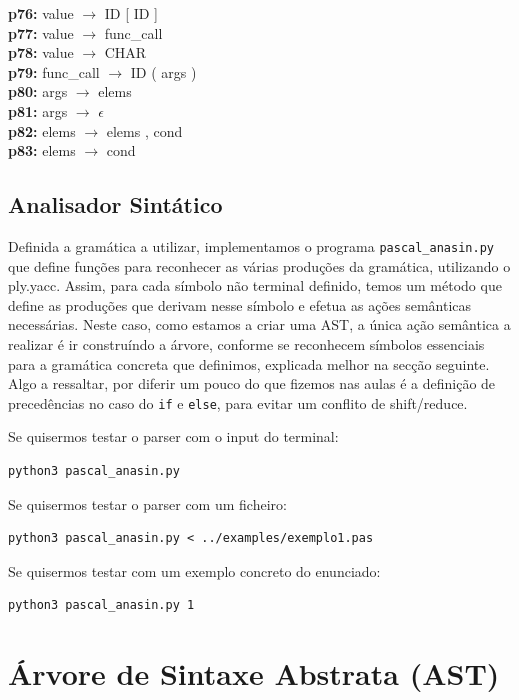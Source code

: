 \documentclass[12pt,a4paper]{report}
\begin{document}
\begin{tabbing}
\textbf{p76:} \> value \(\to\) ID [ ID ] \\
\textbf{p77:} \> value \(\to\) func\_call \\
\textbf{p78:} \> value \(\to\) CHAR \\
\textbf{p79:} \> func\_call \(\to\) ID ( args ) \\
\textbf{p80:} \> args \(\to\) elems \\
\textbf{p81:} \> args \(\to\) \(\epsilon\) \\
\textbf{p82:} \> elems \(\to\) elems , cond \\
\textbf{p83:} \> elems \(\to\) cond \\
\end{tabbing}

\section{Analisador Sintático}
Definida a gramática a utilizar, implementamos o programa \texttt{pascal\_anasin.py} que define funções para reconhecer as várias produções da gramática, utilizando o ply.yacc.
Assim, para cada símbolo não terminal definido, temos um método que define as produções que derivam nesse símbolo e efetua as ações semânticas necessárias.
Neste caso, como estamos a criar uma AST, a única ação semântica a realizar é ir construíndo a árvore, conforme se reconhecem símbolos essenciais para a gramática concreta que definimos, explicada melhor na secção seguinte.
Algo a ressaltar, por diferir um pouco do que fizemos nas aulas é a definição de precedências no caso do \texttt{if} e \texttt{else}, para evitar um conflito de shift/reduce.

\vspace{1em}

Se quisermos testar o parser com o input do terminal:
\begin{verbatim}
python3 pascal_anasin.py
\end{verbatim}

Se quisermos testar o parser com um ficheiro:
\begin{verbatim}
python3 pascal_anasin.py < ../examples/exemplo1.pas
\end{verbatim}

Se quisermos testar com um exemplo concreto do enunciado:
\begin{verbatim}
python3 pascal_anasin.py 1
\end{verbatim}

\chapter{Árvore de Sintaxe Abstrata (AST)}
\end{document}
